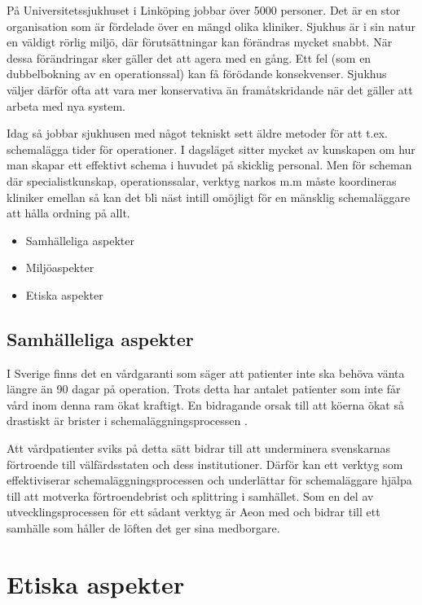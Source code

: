 På Universitetssjukhuset i Linköping jobbar över 5000 personer. Det är en stor organisation som är fördelade över en mängd olika kliniker. Sjukhus är i sin natur en väldigt rörlig miljö, där förutsättningar kan förändras mycket snabbt. När dessa förändringar sker gäller det att agera med en gång. Ett fel (som en dubbelbokning av en operationssal) kan få förödande konsekvenser. Sjukhus väljer därför ofta att vara mer konservativa än framåtskridande när det gäller att arbeta med nya system.

Idag så jobbar sjukhusen med något tekniskt sett äldre metoder för att t.ex. schemalägga tider för operationer. I dagsläget sitter mycket av kunskapen om hur man skapar ett effektivt schema i huvudet på skicklig personal. Men för scheman där specialistkunskap, operationssalar, verktyg narkos m.m måste koordineras kliniker emellan så kan det bli näst intill omöjligt för en mänsklig schemaläggare att hålla ordning på allt.

\begin{itemize}
    \item Samhälleliga aspekter
    \item Miljöaspekter
    \item Etiska aspekter
\end{itemize}

\subsection{Samhälleliga aspekter}

I Sverige finns det en vårdgaranti som säger att patienter inte ska behöva vänta längre än 90 dagar på operation. Trots detta har antalet patienter som inte får vård inom denna ram ökat kraftigt. En bidragande orsak till att köerna ökat så drastiskt är brister i schemaläggningsprocessen \cite{vardko}.

Att vårdpatienter sviks på detta sätt bidrar till att underminera svenskarnas förtroende till välfärdsstaten och dess institutioner. Därför kan ett verktyg som effektiviserar schemaläggningsprocessen och underlättar för schemaläggare hjälpa till att motverka förtroendebrist och splittring i samhället. Som en del av utvecklingsprocessen för ett sådant verktyg är Aeon med och bidrar till ett samhälle som håller de löften det ger sina medborgare.

\section{Etiska aspekter}

